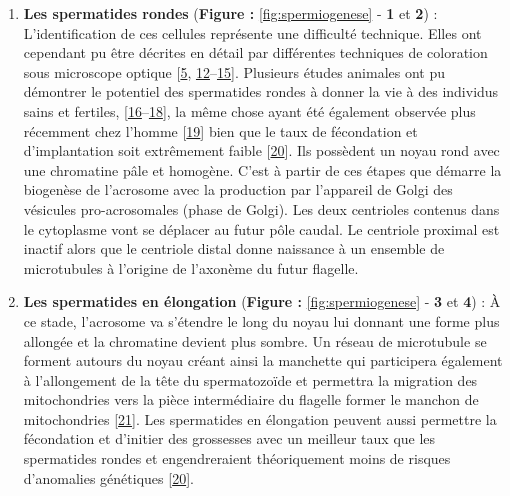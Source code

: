 \documentclass[12pt,twoside]{reedthesis}
\theoremstyle{definition}
\theoremstyle{definition}
\theoremstyle{remark}
\begin{document}
  \begin{enumerate}
  \def\labelenumi{\arabic{enumi}.}
  \item
    \textbf{Les spermatides rondes} (\textbf{Figure :
    }\ref{fig:spermiogenese} - \textbf{1} et \textbf{2}) :
    L'identification de ces cellules représente une difficulté technique.
    Elles ont cependant pu être décrites en détail par différentes
    techniques de coloration sous microscope optique
    {[}\protect\hyperlink{ref-Clermont1963}{5},
    \protect\hyperlink{ref-Papic}{12}--\protect\hyperlink{ref-WorldHealthOrganization1992}{15}{]}.
    Plusieurs études animales ont pu démontrer le potentiel des
    spermatides rondes à donner la vie à des individus sains et fertiles,
    {[}\protect\hyperlink{ref-Ogura1994}{16}--\protect\hyperlink{ref-Sasagawa}{18}{]},
    la même chose ayant été également observée plus récemment chez l'homme
    {[}\protect\hyperlink{ref-Tanaka2015}{19}{]} bien que le taux de
    fécondation et d'implantation soit extrêmement faible
    {[}\protect\hyperlink{ref-Asimakopoulos2003}{20}{]}. Ils possèdent un
    noyau rond avec une chromatine pâle et homogène. C'est à partir de ces
    étapes que démarre la biogenèse de l'acrosome avec la production par
    l'appareil de Golgi des vésicules pro-acrosomales (phase de Golgi).
    Les deux centrioles contenus dans le cytoplasme vont se déplacer au
    futur pôle caudal. Le centriole proximal est inactif alors que le
    centriole distal donne naissance à un ensemble de microtubules à
    l'origine de l'axonème du futur flagelle.
  \item
    \textbf{Les spermatides en élongation} (\textbf{Figure :
    }\ref{fig:spermiogenese} - \textbf{3} et \textbf{4}) : À ce stade,
    l'acrosome va s'étendre le long du noyau lui donnant une forme plus
    allongée et la chromatine devient plus sombre. Un réseau de
    microtubule se forment autours du noyau créant ainsi la manchette qui
    participera également à l'allongement de la tête du spermatozoïde et
    permettra la migration des mitochondries vers la pièce intermédiaire
    du flagelle former le manchon de mitochondries
    {[}\protect\hyperlink{ref-Moreno2006}{21}{]}. Les spermatides en
    élongation peuvent aussi permettre la fécondation et d'initier des
    grossesses avec un meilleur taux que les spermatides rondes et
    engendreraient théoriquement moins de risques d'anomalies génétiques
    {[}\protect\hyperlink{ref-Asimakopoulos2003}{20}{]}.
  \end{enumerate}
  
\end{document}
